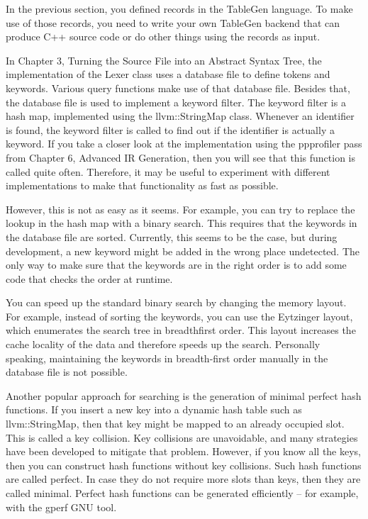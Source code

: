 
In the previous section, you defined records in the TableGen language. To make use of those records, you need to write your own TableGen backend that can produce C++ source code or do other things using the records as input.

In Chapter 3, Turning the Source File into an Abstract Syntax Tree, the implementation of the Lexer class uses a database file to define tokens and keywords. Various query functions make use of that database file. Besides that, the database file is used to implement a keyword filter. The keyword filter is a hash map, implemented using the llvm::StringMap class. Whenever an identifier is found, the keyword filter is called to find out if the identifier is actually a keyword. If you take a closer look at the implementation using the ppprofiler pass from Chapter 6, Advanced IR Generation, then you will see that this function is called quite often. Therefore, it may be useful to experiment with different implementations to make that functionality as fast as possible.

However, this is not as easy as it seems. For example, you can try to replace the lookup in the hash map with a binary search. This requires that the keywords in the database file are sorted. Currently, this seems to be the case, but during development, a new keyword might be added in the wrong place undetected. The only way to make sure that the keywords are in the right order is to add some code that checks the order at runtime.

You can speed up the standard binary search by changing the memory layout. For example, instead of sorting the keywords, you can use the Eytzinger layout, which enumerates the search tree in breadthfirst order. This layout increases the cache locality of the data and therefore speeds up the search. Personally speaking, maintaining the keywords in breadth-first order manually in the database file is not possible.

Another popular approach for searching is the generation of minimal perfect hash functions. If you insert a new key into a dynamic hash table such as llvm::StringMap, then that key might be mapped to an already occupied slot. This is called a key collision. Key collisions are unavoidable, and many strategies have been developed to mitigate that problem. However, if you know all the keys, then you can construct hash functions without key collisions. Such hash functions are called perfect. In case they do not require more slots than keys, then they are called minimal. Perfect hash functions can be generated efficiently – for example, with the gperf GNU tool.

